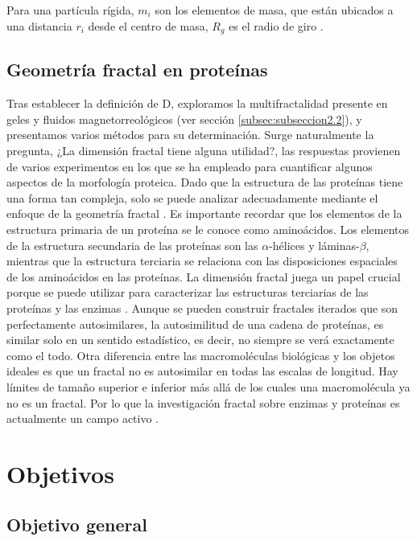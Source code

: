 \documentclass[11pt]{article}
\begin{document}
Para una partícula rígida, \( m_i \) son los elementos de masa, que est\'{a}n ubicados a una distancia \( r_i \) desde el centro de masa, \(R_g\) es el radio de giro \cite{IUPAC2019}.

   
\subsection{Geometr\'{i}a fractal en prote\'{i}nas}
\label{subsec:subseccion2.6}


Tras establecer la definición de D, exploramos la multifractalidad presente en geles y fluidos magnetorreológicos (ver sección \ref{subsec:subseccion2.2}), y presentamos varios métodos para su determinación. Surge naturalmente la pregunta, ¿La dimensi\'{o}n fractal tiene alguna utilidad?, las respuestas provienen de varios experimentos en los que se ha empleado para cuantificar algunos aspectos de la morfolog\'{i}a proteica. Dado que la estructura de las prote\'{i}nas tiene una forma tan compleja, solo se puede analizar adecuadamente mediante el enfoque de la geometr\'{i}a fractal \cite{Mustafa1996}. 
Es importante recordar que los elementos de la estructura primaria de un prote\'{i}na se le conoce como amino\'{a}cidos. Los elementos de la estructura secundaria de las prote\'{i}nas son las $\alpha$-h\'{e}lices y l\'{a}minas-$\beta$, mientras que la estructura terciaria se relaciona con las disposiciones espaciales de los amino\'{a}cidos en las prote\'{i}nas. La dimensi\'{o}n fractal juega un papel crucial porque se puede utilizar para caracterizar las estructuras terciarias de las prote\'{i}nas y las enzimas \cite{Mustafa1996}. Aunque se pueden construir fractales iterados que son perfectamente autosimilares, la autosimilitud de una cadena de prote\'{i}nas, es similar solo en un sentido estad\'{i}stico, es decir, no siempre se ver\'{a} exactamente como el todo. Otra diferencia entre las macromol\'{e}culas biol\'{o}gicas y los objetos ideales es que un fractal no es autosimilar en todas las escalas de longitud. Hay l\'{i}mites de tamaño superior e inferior m\'{a}s all\'{a} de los cuales una macromol\'{e}cula ya no es un fractal. Por lo que la investigaci\'{o}n fractal sobre enzimas y prote\'{i}nas es actualmente un campo activo \cite{Mustafa1996}. 


\clearpage


\section{Objetivos}
\subsection{Objetivo general}
\end{document}
